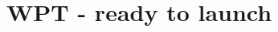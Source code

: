 \documentclass[11pt]{scrartcl}
\begin{document}

\section{WPT - ready to launch}
\label{sec:wpt}
\vspace{0.2cm}
\vspace{0.5cm}


\end{document}
